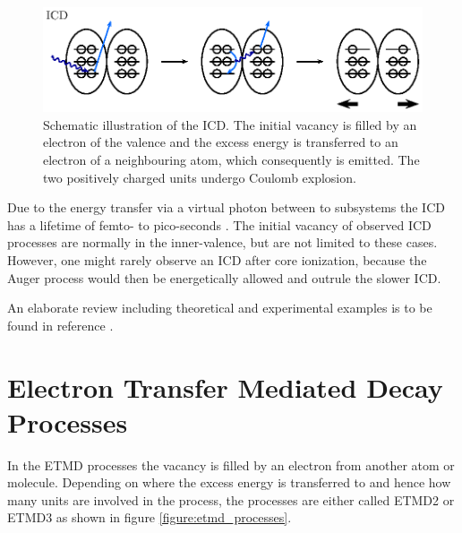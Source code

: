 \begin{figure}[h]
 \centering
 \includegraphics{pics/icd-pspic.eps}
 \caption{Schematic illustration of the \ac{ICD}. The initial vacancy is filled
          by an electron of the valence and the excess energy is transferred to
          an electron of a neighbouring atom, which consequently is emitted.
          The two positively charged units undergo Coulomb explosion.}
 \label{figure:icd_process}
\end{figure}


Due to the energy transfer via a virtual photon between to subsystems
the ICD has a lifetime of femto- to pico-seconds \cite{Zobeley98,Santra01_1,
Zobeley01,Santra01_3,Averbukh04,Averbukh05}.
The initial vacancy of observed ICD processes are normally in the inner-valence,
but are not limited to these cases. However, one might rarely observe
an ICD after core ionization, because the Auger process would then be energetically
allowed and outrule the slower ICD.

An elaborate review including theoretical and experimental examples is to be
found in reference \cite{Hergenhahn11}.


\section{Electron Transfer Mediated Decay Processes}
In the \ac{ETMD} processes the vacancy is filled by an electron from another
atom or molecule. Depending on where
the excess energy is transferred to and
hence how many units are involved in the process, the processes are either called
ETMD2 or ETMD3 as shown in figure \ref{figure:etmd_processes}.

